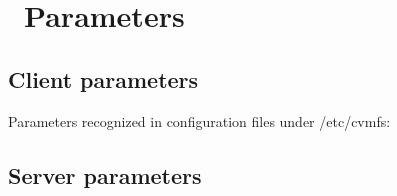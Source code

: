 \chapter{\cvmfs\ Parameters}
\label{apx:parameters}

\section{Client parameters}
Parameters recognized in configuration files under /etc/cvmfs:
 

\section{Server parameters}
